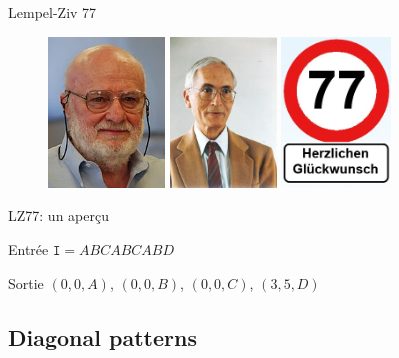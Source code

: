 \documentclass[10pt]{beamer}
\begin{document}
\begin{frame}{Lempel-Ziv 77}
\pause
\begin{figure}
\centering
\includegraphics[height = 4cm]{images/lempel.jpg} \hspace{0.5cm} \pause
\includegraphics[height = 4cm]{images/ziv.jpg} \hspace{0.5cm} \pause
\includegraphics[height = 4cm]{images/77.jpg}
\end{figure}
\end{frame}

\begin{frame}{LZ77: un aperçu}
\begin{block}{Entrée}
$\texttt{I}=ABCABCABD$
\end{block}

\bigskip \bigskip

\begin{block}{Sortie}
$(0,0,A)$,
$(0,0,B)$,
$(0,0,C)$,
$(3,5,D)$
\end{block}
\end{frame}


\subsection{Diagonal patterns}
\end{document}
